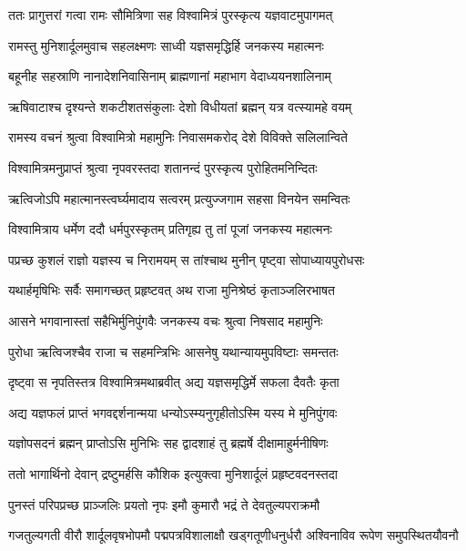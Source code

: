 
\twolineshloka
{ततः प्रागुत्तरां गत्वा रामः सौमित्रिणा सह}
{विश्वामित्रं पुरस्कृत्य यज्ञवाटमुपागमत्} %

\twolineshloka
{रामस्तु मुनिशार्दूलमुवाच सहलक्ष्मणः}
{साध्वी यज्ञसमृद्धिर्हि जनकस्य महात्मनः} %

\twolineshloka
{बहूनीह सहस्राणि नानादेशनिवासिनाम्}
{ब्राह्मणानां महाभाग वेदाध्ययनशालिनाम्} %

\twolineshloka
{ऋषिवाटाश्च दृश्यन्ते शकटीशतसंकुलाः}
{देशो विधीयतां ब्रह्मन् यत्र वत्स्यामहे वयम्} %

\twolineshloka
{रामस्य वचनं श्रुत्वा विश्वामित्रो महामुनिः}
{निवासमकरोद् देशे विविक्ते सलिलान्विते} %

\twolineshloka
{विश्वामित्रमनुप्राप्तं श्रुत्वा नृपवरस्तदा}
{शतानन्दं पुरस्कृत्य पुरोहितमनिन्दितः} %

\twolineshloka
{ऋत्विजोऽपि महात्मानस्त्वर्घ्यमादाय सत्वरम्}
{प्रत्युज्जगाम सहसा विनयेन समन्वितः} %

\twolineshloka
{विश्वामित्राय धर्मेण ददौ धर्मपुरस्कृतम्}
{प्रतिगृह्य तु तां पूजां जनकस्य महात्मनः} %

\twolineshloka
{पप्रच्छ कुशलं राज्ञो यज्ञस्य च निरामयम्}
{स तांश्चाथ मुनीन् पृष्ट्वा सोपाध्यायपुरोधसः} %

\twolineshloka
{यथार्हमृषिभिः सर्वैः समागच्छत् प्रहृष्टवत्}
{अथ राजा मुनिश्रेष्ठं कृताञ्जलिरभाषत} %

\twolineshloka
{आसने भगवानास्तां सहैभिर्मुनिपुंगवैः}
{जनकस्य वचः श्रुत्वा निषसाद महामुनिः} %

\twolineshloka
{पुरोधा ऋत्विजश्चैव राजा च सहमन्त्रिभिः}
{आसनेषु यथान्यायमुपविष्टाः समन्ततः} %

\twolineshloka
{दृष्ट्वा स नृपतिस्तत्र विश्वामित्रमथाब्रवीत्}
{अद्य यज्ञसमृद्धिर्मे सफला दैवतैः कृता} %

\twolineshloka
{अद्य यज्ञफलं प्राप्तं भगवद्दर्शनान्मया}
{धन्योऽस्म्यनुगृहीतोऽस्मि यस्य मे मुनिपुंगवः} %

\twolineshloka
{यज्ञोपसदनं ब्रह्मन् प्राप्तोऽसि मुनिभिः सह}
{द्वादशाहं तु ब्रह्मर्षे दीक्षामाहुर्मनीषिणः} %

\twolineshloka
{ततो भागार्थिनो देवान् द्रष्टुमर्हसि कौशिक}
{इत्युक्त्वा मुनिशार्दूलं प्रहृष्टवदनस्तदा} %

\twolineshloka
{पुनस्तं परिपप्रच्छ प्राञ्जलिः प्रयतो नृपः}
{इमौ कुमारौ भद्रं ते देवतुल्यपराक्रमौ} %

\threelineshloka
{गजतुल्यगती वीरौ शार्दूलवृषभोपमौ}
{पद्मपत्रविशालाक्षौ खड्गतूणीधनुर्धरौ}
{अश्विनाविव रूपेण समुपस्थितयौवनौ} %


